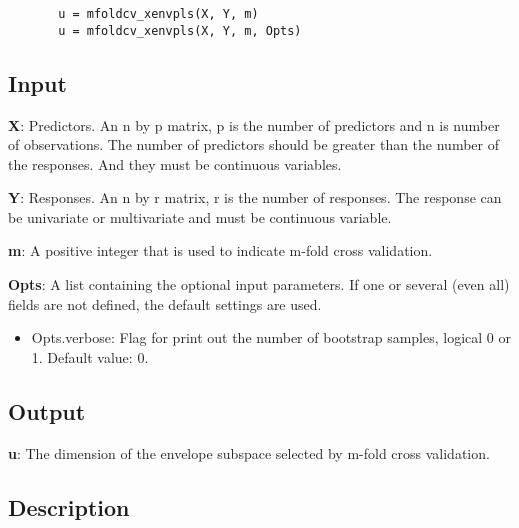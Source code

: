 \documentclass[a4paper,11pt,openany]{memoir}
\begin{document}
\begin{verbatim}       u = mfoldcv_xenvpls(X, Y, m)
       u = mfoldcv_xenvpls(X, Y, m, Opts)\end{verbatim}
    

\subsection*{Input}

\begin{par}
\textbf{X}: Predictors. An n by p matrix, p is the number of predictors and n is number of observations. The number of predictors should be greater than the number of the responses. And they must be continuous variables.
\end{par} \vspace{1em}
\begin{par}
\textbf{Y}: Responses. An n by r matrix, r is the number of responses. The response can be univariate or multivariate and must be continuous variable.
\end{par} \vspace{1em}
\begin{par}
\textbf{m}: A positive integer that is used to indicate m-fold cross validation.
\end{par} \vspace{1em}
\begin{par}
\textbf{Opts}: A list containing the optional input parameters. If one or several (even all) fields are not defined, the default settings are used.
\end{par} \vspace{1em}
\begin{itemize}
\setlength{\itemsep}{-1ex}
   \item Opts.verbose: Flag for print out the number of bootstrap samples, logical 0 or 1. Default value: 0.
\end{itemize}


\subsection*{Output}

\begin{par}
\textbf{u}: The dimension of the envelope subspace selected by m-fold cross validation.
\end{par} \vspace{1em}
    

\subsection*{Description}
\end{document}

